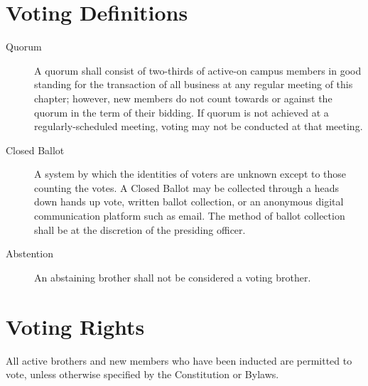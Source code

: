 \section{Voting Definitions}
\begin{description}
        \item[Quorum] A quorum shall consist of two-thirds of active-on campus members in good standing for the transaction of all business at any regular meeting of this chapter; however, new members do not count towards or against the quorum in the term of their bidding.
If quorum is not achieved at a regularly-scheduled meeting, voting may not be conducted at that meeting.

\item[Closed Ballot] A system by which the identities of voters are unknown except to those counting the votes.
A Closed Ballot may be collected through a heads down hands up vote, written ballot collection, or an anonymous digital communication platform such as email.
The method of ballot collection shall be at the discretion of the presiding officer.

\item[Abstention] An abstaining brother shall not be considered a voting brother.
\end{description}
\section{Voting Rights}
All active brothers and new members who have been inducted are permitted to vote, unless otherwise specified by the Constitution or Bylaws.

